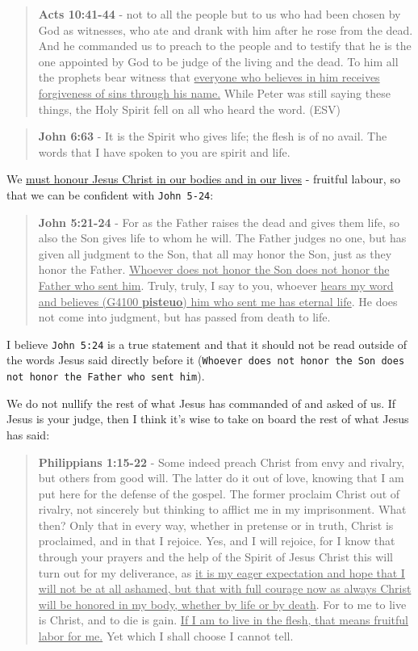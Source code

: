 \documentclass[11pt]{article}
\begin{document}
\begin{quote}
\textbf{Acts 10:41-44} - not to all the people but to us who had been chosen by God as witnesses, who ate and drank with him after he rose from the dead. And he commanded us to preach to the people and to testify that he is the one appointed by God to be judge of the living and the dead. To him all the prophets bear witness that \uline{everyone who believes in him receives forgiveness of sins through his name.} While Peter was still saying these things, the Holy Spirit fell on all who heard the word. (ESV)
\end{quote}

\begin{quote}
\textbf{John 6:63} - It is the Spirit who gives life; the flesh is of no avail. The words that I have spoken to you are spirit and life.
\end{quote}

We \uline{must honour Jesus Christ in our bodies and in our lives} - fruitful labour, so that we can be confident with \texttt{John 5-24}:

\begin{quote}
\textbf{John 5:21-24} - For as the Father raises the dead and gives them life, so also the Son gives life to whom he will. The Father judges no one, but has given all judgment to the Son, that all may honor the Son, just as they honor the Father. \uline{Whoever does not honor the Son does not honor the Father who sent him}. Truly, truly, I say to you, whoever \uline{hears my word and believes (G4100 \textbf{pisteuo}) him who sent me has eternal life}. He does not come into judgment, but has passed from death to life.
\end{quote}

I believe \texttt{John 5:24} is a true statement and that it should not be read outside of the words Jesus said directly before it (\texttt{Whoever does not honor the Son does not honor the Father who sent him}).

We do not nullify the rest of what Jesus has commanded of and asked of us. If Jesus is your judge, then I think it's wise to take on board the rest of what Jesus has said:

\begin{quote}
\textbf{Philippians 1:15-22} - Some indeed preach Christ from envy and rivalry, but others from good will. The latter do it out of love, knowing that I am put here for the defense of the gospel. The former proclaim Christ out of rivalry, not sincerely but thinking to afflict me in my imprisonment. What then? Only that in every way, whether in pretense or in truth, Christ is proclaimed, and in that I rejoice. Yes, and I will rejoice, for I know that through your prayers and the help of the Spirit of Jesus Christ this will turn out for my deliverance, as \uline{it is my eager expectation and hope that I will not be at all ashamed, but that with full courage now as always Christ will be honored in my body, whether by life or by death}. For to me to live is Christ, and to die is gain. \uline{If I am to live in the flesh, that means fruitful labor for me.} Yet which I shall choose I cannot tell.
\end{quote}
\end{document}
